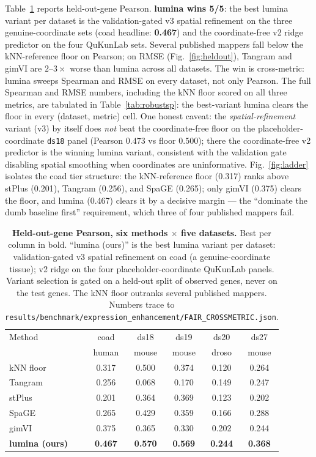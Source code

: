\documentclass[10pt,letterpaper]{article}
\begin{document}
Table~\ref{tab:robust} reports held-out-gene Pearson. \textbf{lumina wins 5/5}: the
best lumina variant per dataset is the validation-gated v3 spatial refinement on the
three genuine-coordinate sets (coad headline: \textbf{0.467}) and the coordinate-free
v2 ridge predictor on the four QuKunLab sets. Several published mappers fall below the
kNN-reference floor on Pearson; on RMSE (Fig.~\ref{fig:heldout}), Tangram and gimVI
are $2$--$3\times$ worse than lumina across all datasets. The win is cross-metric:
lumina sweeps Spearman and RMSE on every dataset, not only Pearson. The full Spearman
and RMSE numbers, including the kNN floor scored on all three metrics, are tabulated in
Table~\ref{tab:robustsp}: the best-variant lumina clears the floor in every
(dataset, metric) cell. One honest caveat: the \emph{spatial-refinement} variant (v3)
by itself does \emph{not} beat the coordinate-free floor on the placeholder-coordinate
\texttt{ds18} panel (Pearson $0.473$ vs floor $0.500$); there the coordinate-free v2
predictor is the winning lumina variant, consistent with the validation gate disabling
spatial smoothing when coordinates are uninformative.
Fig.~\ref{fig:ladder} isolates the coad tier structure: the kNN-reference floor (0.317)
ranks above stPlus (0.201), Tangram (0.256), and SpaGE (0.265); only gimVI (0.375)
clears the floor, and lumina (0.467) clears it by a decisive margin --- the
``dominate the dumb baseline first'' requirement, which three of four published mappers fail.

\begin{table}[h]
\centering
\small
\caption{\textbf{Held-out-gene Pearson, six methods $\times$ five datasets.}
Best per column in bold. ``lumina (ours)'' is the best lumina variant per dataset:
validation-gated v3 spatial refinement on coad (a genuine-coordinate tissue); v2 ridge
on the four placeholder-coordinate QuKunLab panels. Variant selection is gated on a
held-out split of observed genes, never on the test genes. The kNN floor outranks
several published mappers.
Numbers trace to \texttt{results/benchmark/expression\_enhancement/FAIR\_CROSSMETRIC.json}.}
\label{tab:robust}
\begin{tabular}{lccccc}
\toprule
Method & coad & ds18 & ds19 & ds20 & ds27\\
       & \footnotesize human & \footnotesize mouse & \footnotesize mouse
       & \footnotesize droso & \footnotesize mouse\\
\midrule
kNN floor & 0.317 & 0.500 & 0.374 & 0.120 & 0.264\\
Tangram   & 0.256 & 0.068 & 0.170 & 0.149 & 0.247\\
stPlus    & 0.201 & 0.364 & 0.369 & 0.123 & 0.202\\
SpaGE     & 0.265 & 0.429 & 0.359 & 0.166 & 0.288\\
gimVI     & 0.375 & 0.365 & 0.330 & 0.202 & 0.244\\
\midrule
\textbf{lumina (ours)} & \textbf{0.467} & \textbf{0.570} & \textbf{0.569}
                        & \textbf{0.244} & \textbf{0.368}\\
\bottomrule
\end{tabular}
\end{table}
\end{document}
